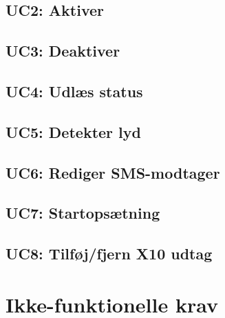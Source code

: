 \subsection{UC2: Aktiver}



\subsection{UC3: Deaktiver}



\subsection{UC4: Udlæs status}



\subsection{UC5: Detekter lyd}



\subsection{UC6: Rediger SMS-modtager}



\subsection{UC7: Startopsætning}



\subsection{UC8: Tilføj/fjern X10 udtag}



\section{Ikke-funktionelle krav}



